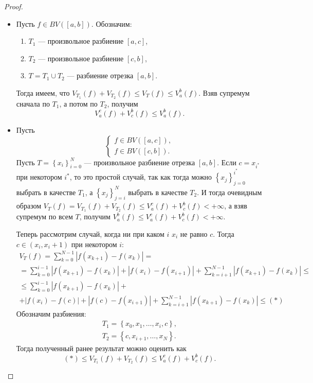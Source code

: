 \begin{proof}\tab
    \begin{itemize}
        \item[$\underline{\Longrightarrow}$] Пусть $f \in B V([a, b])$. Обозначим:
        \begin{enumerate}
            \item $T_1$ — произвольное разбиение $[a, c]$,
            \item $T_2$ — произвольное разбиение $[c, b]$,
            \item $T=T_1 \cup T_2$ — разбиение отрезка $[a, b]$.
        \end{enumerate}
        Тогда имеем, что $V_{T_1}(f)+V_{T_2}(f) \leqslant V_T(f) \leqslant V_a^b(f)$.
        Взяв супремум сначала по $T_1$, а потом по $T_2$, получим
        \[V_a^c(f)+V_c^b(f) \leqslant V_a^b(f).\]
    \item[$\underline{\Longleftarrow}$]
        Пусть 
        $$\left\{\begin{array}{l}f \in B V([a, c]), \\ f \in B V([c, b]).\end{array}\right.$$
        Пусть $T=\left\{x_i\right\}_{i=0}^N$ — произвольное разбиение отрезка $[a, b]$.
        Если $c=x_{i^*}$ при некотором $i^*$, то это простой случай, так как тогда можно $\left\{x_j\right\}_{j=0}^{i^*}$ выбрать в качестве $T_1$, а $\left\{x_j\right\}_{j=i}^N$ выбрать в качестве $T_2$. И тогда очевидным образом $V_T(f)=V_{T_1}(f)+V_{T_2}(f) \leqslant V_a^c(f)+V_c^b(f)<+\infty$, а взяв супремум по всем $T$, получим $V_a^b(f) \leqslant V_a^c(f)+V_c^b(f)<+\infty$.

        Теперь рассмотрим случай, когда ни при каком $i$ $x_i$ не равно $c$. Тогда $c \in \left(x_i, x_i+1\right)$ при некотором $i$:
        \begin{multline*}
            V_T(f) =\sum_{k=0}^{N-1}\left|f\left(x_{k+1}\right)-f\left(x_k\right)\right|
            =\\=
            \sum_{k=0}^{i-1}\left|f\left(x_{k+1}\right)-f\left(x_k\right)\right|
            +
            \left|f\left(x_i\right)-f\left(x_{i+1}\right)\right|
            +
            \sum_{k=i+1}^{N-1}\left|f\left(x_{k+1}\right)-f\left(x_k\right)\right| \leqslant \\
            \leqslant \sum_{k=0}^{i-1}\left|f\left(x_{k+1}\right)-f\left(x_k\right)\right|
            +\\+
            \left|f\left(x_i\right)-f(c)\right|+\left|f(c)-f\left(x_{i+1}\right)\right|+\sum_{k=i+1}^{N-1}\left|f\left(x_{k+1}\right)-f\left(x_k\right)\right| \leqslant (*)
        \end{multline*} 
        Обозначим разбиения:
        $$
        \begin{aligned}
             T_1=\left\{x_0, x_1, \ldots, x_i, c\right\}, \\
            T_2=\left\{c, x_{i+1}, \ldots, x_N\right\}.
        \end{aligned}
        $$
        Тогда полученный ранее результат можно оценить как
        $$(*) \leqslant V_{T_1}(f)+V_{T_2}(f) \leqslant V_a^c(f)+V_c^b(f).$$


\end{itemize}
\end{proof}

